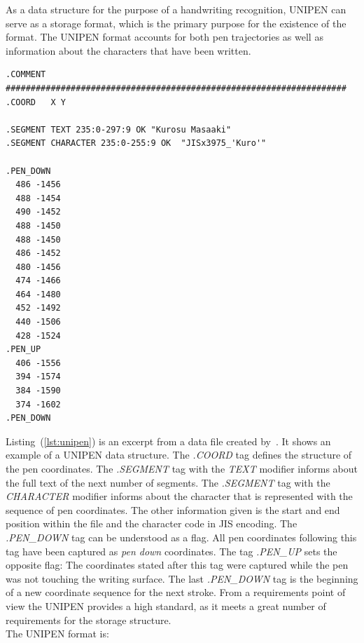 As a data structure for the purpose of a handwriting recognition, UNIPEN can 
serve as a storage format, which is the primary purpose for the existence of the
format. The UNIPEN format accounts for both pen trajectories as well as 
information about the characters that have been written.
\begin{texcode}
  \begin{lstlisting}[emph={COMMENT,COORD,SEGMENT},emphstyle=\textbf,caption={Demonstration of the \emph{UNIPEN} format},label=lst:unipen]
.COMMENT #################################################################### 
.COORD   X Y

.SEGMENT TEXT 235:0-297:9 OK "Kurosu Masaaki"
.SEGMENT CHARACTER 235:0-255:9 OK  "JISx3975_'Kuro'"

.PEN_DOWN 
  486 -1456 
  488 -1454 
  490 -1452 
  488 -1450 
  488 -1450 
  486 -1452 
  480 -1456 
  474 -1466 
  464 -1480 
  452 -1492 
  440 -1506 
  428 -1524
.PEN_UP 
  406 -1556 
  394 -1574 
  384 -1590 
  374 -1602
.PEN_DOWN 
  \end{lstlisting}
\end{texcode}
Listing~(\ref{lst:unipen}) is an excerpt from a data file created 
by~. It shows an example of a UNIPEN data structure.
The \emph{.COORD} tag defines the structure of the pen coordinates. 
The \emph{.SEGMENT} tag with the \emph{TEXT} modifier informs about the
full text of the next number of segments. The \emph{.SEGMENT} tag with the
\emph{CHARACTER} modifier informs about the character that is represented
with the sequence of pen coordinates. The other information given is the
start and end position within the file and the character code in JIS encoding.
The \emph{.PEN\_DOWN} tag can be understood as a flag. All pen coordinates 
following this tag have been captured as \emph{pen down} coordinates.
The tag \emph{.PEN\_UP} sets the opposite flag: The coordinates stated after 
this tag were captured while the pen was not touching the writing surface.
The last \emph{.PEN\_DOWN} tag is the beginning of a new coordinate sequence
for the next stroke. From a requirements point of view the UNIPEN provides a
high standard, as it meets a great number of requirements for the storage 
structure. \\
The UNIPEN format is:
